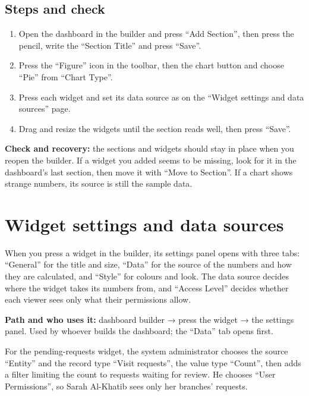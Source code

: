 \subsection{Steps and check}
\begin{enumerate}
\item Open the dashboard in the builder and press “Add Section”, then press the pencil, write the “Section Title” and press “Save”.
\item Press the “Figure” icon in the toolbar, then the chart button and choose “Pie” from “Chart Type”.
\item Press each widget and set its data source as on the “Widget settings and data sources” page.
\item Drag and resize the widgets until the section reads well, then press “Save”.
\end{enumerate}

\textbf{Check and recovery:} the sections and widgets should stay in place when you reopen the builder. If a widget you added seems to be missing, look for it in the dashboard's last section, then move it with “Move to Section”. If a chart shows strange numbers, its source is still the sample data.

\clearpage
\section{Widget settings and data sources}
\label{sec:builder-feature-dashboards-widget-settings}

When you press a widget in the builder, its settings panel opens with three tabs: “General” for the title and size, “Data” for the source of the numbers and how they are calculated, and “Style” for colours and look. The data source decides where the widget takes its numbers from, and “Access Level” decides whether each viewer sees only what their permissions allow.

\textbf{Path and who uses it:} dashboard builder → press the widget → the settings panel. Used by whoever builds the dashboard; the “Data” tab opens first.

\begin{rcnote}
For the pending-requests widget, the system administrator chooses the source “Entity” and the record type “Visit requests”, the value type “Count”, then adds a filter limiting the count to requests waiting for review. He chooses “User Permissions”, so Sarah Al-Khatib sees only her branches' requests.
\end{rcnote}

